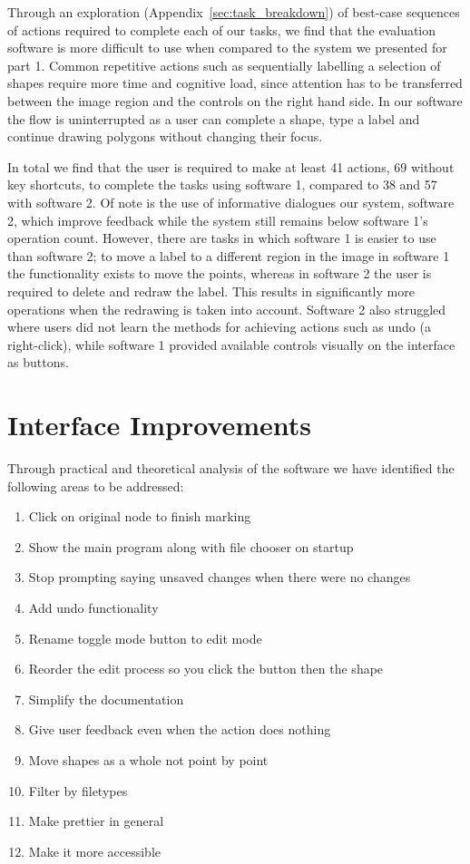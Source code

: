 \documentclass[a4paper,11pt,oneside]{article}
\begin{document}
Through an exploration (Appendix~\ref{sec:task_breakdown}) of best-case sequences of actions required to complete each of our tasks, we find that the evaluation software is more difficult to use when compared to the system we presented for part 1. Common repetitive actions such as sequentially labelling a selection of shapes require more time and cognitive load, since attention has to be transferred between the image region and the controls on the right hand side. In our software the flow is uninterrupted as a user can complete a shape, type a label and continue drawing polygons without changing their focus.

In total we find that the user is required to make at least 41 actions, 69 without key shortcuts, to complete the tasks using software 1, compared to 38 and 57 with software 2. Of note is the use of informative dialogues our system, software 2, which improve feedback while the system still remains below software 1's operation count. However, there are tasks in which software 1 is easier to use than software 2; to move a label to a different region in the image in software 1 the functionality exists to move the points, whereas in software 2 the user is required to delete and redraw the label. This results in significantly more operations when the redrawing is taken into account. Software 2 also struggled where users did not learn the methods for achieving actions such as undo (a right-click), while software 1 provided available controls visually on the interface as buttons.

\section{Interface Improvements}
Through practical and theoretical analysis of the software we have identified the following areas to be addressed:
\begin{enumerate}
    \item{Click on original node to finish marking}
    \item{Show the main program along with file chooser on startup}
    \item{Stop prompting saying unsaved changes when there were no changes}
    \item{Add undo functionality}
    \item{Rename toggle mode button to edit mode}
    \item{Reorder the edit process so you click the button then the shape}
    \item{Simplify the documentation}
    \item{Give user feedback even when the action does nothing}
    \item{Move shapes as a whole not point by point}
    \item{Filter by filetypes}
    \item{Make prettier in general}
    \item{Make it more accessible}
\end{enumerate}
\end{document}
